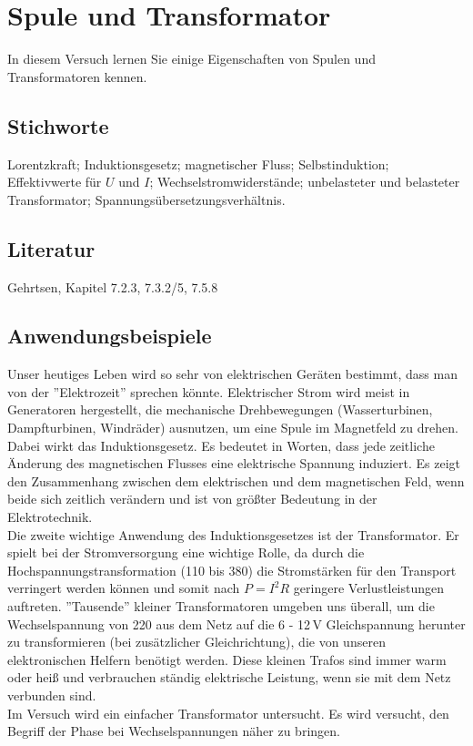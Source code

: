 \chapter{Spule und Transformator}
\label{v:16}

In diesem Versuch lernen Sie einige Eigenschaften von Spulen und Transformatoren kennen.

\section{Stichworte}

Lorentzkraft; Induktionsgesetz; magnetischer Fluss; Selbstinduktion; Effektivwerte für $U$ und $I$; Wechselstromwiderstände; unbelasteter und belasteter Transformator; Spannungsübersetzungsverhältnis.
%
\section{Literatur}

Gehrtsen, Kapitel 7.2.3, 7.3.2/5, 7.5.8
%
\section{Anwendungsbeispiele}

Unser heutiges Leben wird so sehr von elektrischen Geräten bestimmt, dass man von der ''Elektrozeit'' sprechen könnte. Elektrischer Strom wird meist in Generatoren hergestellt, die mechanische Drehbewegungen (Wasserturbinen, Dampfturbinen, Windräder) ausnutzen, um eine Spule im Magnetfeld zu drehen. Dabei wirkt das Induktionsgesetz. Es bedeutet in Worten, dass jede zeitliche Änderung des magnetischen Flusses eine elektrische Spannung induziert. Es zeigt den Zusammenhang zwischen dem elektrischen und dem magnetischen Feld, wenn beide sich zeitlich verändern und ist von größter Bedeutung in der Elektrotechnik.\\
Die zweite wichtige Anwendung des Induktionsgesetzes ist der Transformator. Er spielt bei der Stromversorgung eine wichtige Rolle, da durch die Hochspannungstransformation (\unit{110}{\kilo}{\volt} bis \unit{380}{\kilo}{\volt}) die Stromstärken für den Transport verringert werden können und somit nach $P = I^2 R$ geringere Verlustleistungen auftreten. ''Tausende'' kleiner Transformatoren umgeben uns überall, um die Wechselspannung von \unit{220}{\volt} aus dem Netz auf die 6 - 12\,V Gleichspannung herunter zu transformieren (bei zusätzlicher Gleichrichtung), die von unseren elektronischen Helfern benötigt werden. Diese kleinen Trafos sind immer warm oder heiß und verbrauchen ständig elektrische Leistung, wenn sie mit dem Netz verbunden sind.\\
Im Versuch wird ein einfacher Transformator untersucht. Es wird versucht, den Begriff der Phase bei Wechselspannungen näher zu bringen.

